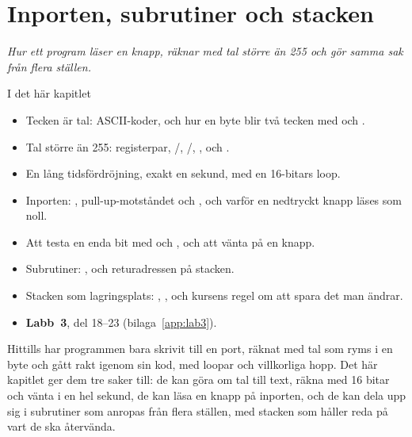 
\chapter{Inporten, subrutiner och stacken}
\label{c10:ch}

{\large\itshape Hur ett program läser en knapp, räknar med tal större än 255 och gör samma sak från
flera ställen.\par}

\begin{chapterbox}{I det här kapitlet}
\begin{itemize}
  \item Tecken är tal: ASCII-koder, och hur en byte blir två tecken med  och
    .
  \item Tal större än 255: registerpar, /, /,
    ,  och .
  \item En lång tidsfördröjning, exakt en sekund, med en 16-bitars loop.
  \item Inporten: , pull-up-motståndet och , och varför en nedtryckt knapp
    läses som noll.
  \item Att testa en enda bit med  och , och att vänta på en knapp.
  \item Subrutiner: ,  och returadressen på stacken.
  \item Stacken som lagringsplats: , , och kursens regel om att spara det man
    ändrar.
  \item \textbf{Labb~3}, del 18--23 (bilaga~\ref{app:lab3}).
\end{itemize}
\end{chapterbox}

Hittills har programmen bara skrivit till en port, räknat med tal som ryms i en byte och gått
rakt igenom sin kod, med loopar och villkorliga hopp. Det här kapitlet ger dem tre saker till: de
kan göra om tal till text, räkna med 16 bitar och vänta i en hel sekund, de kan läsa en knapp på
inporten, och de kan dela upp sig i subrutiner som anropas från flera ställen, med stacken som
håller reda på vart de ska återvända.

